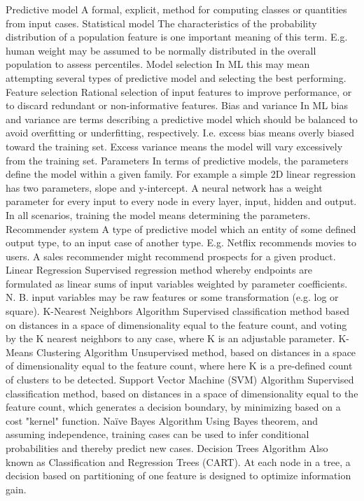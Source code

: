 \begin{appendices}
Predictive model	A formal, explicit, method for computing classes or quantities from input cases.
Statistical model	The characteristics of the probability distribution of a population feature is one important meaning of this term.  E.g. human weight may be assumed to be normally distributed in the overall population to assess percentiles.
Model selection	In ML this may mean attempting several types of predictive model and selecting the best performing.
Feature selection	Rational selection of input features to improve performance, or to discard redundant or non-informative features.
Bias and variance	In ML bias and variance are terms describing a predictive model which should be balanced to avoid overfitting or underfitting, respectively.  I.e. excess bias means overly biased toward the training set.  Excess variance means the model will vary excessively from the training set.
Parameters	In terms of predictive models, the parameters define the model within a given family.  For example a simple 2D linear regression has two parameters, slope and y-intercept.  A neural network has a weight parameter for every input to every node in every layer, input, hidden and output.  In all scenarios, training the model means determining the parameters.
Recommender system	A type of predictive model which an entity of some defined output type, to an input case of another type.  E.g. Netflix recommends movies to users.  A sales recommender might recommend prospects for a given product.
Linear Regression	Supervised regression method whereby endpoints are formulated as linear sums of input variables weighted by parameter coefficients.  N. B. input variables may be raw features or some transformation (e.g. log or square).
K-Nearest Neighbors Algorithm	Supervised classification method based on distances in a space of dimensionality equal to the feature count, and voting by the K nearest neighbors to any case, where K is an adjustable parameter.
K-Means Clustering Algorithm	Unsupervised method, based on distances in a space of dimensionality equal to the feature count, where here K is a pre-defined count of clusters to be detected.
Support Vector Machine (SVM) Algorithm	Supervised classification method, based on distances in a space of dimensionality equal to the feature count, which generates a decision boundary, by minimizing based on a cost "kernel" function.
Naïve Bayes Algorithm	Using Bayes theorem, and assuming independence, training cases can be used to infer conditional probabilities and thereby predict new cases.
Decision Trees Algorithm	Also known as Classification and Regression Trees (CART).  At each node in a tree, a decision based on partitioning of one feature is designed to optimize information gain.

\end{appendices}
